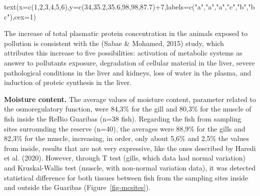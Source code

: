 \documentclass[
  american,
  letterpaper,
  DIV=11,
  numbers=noendperiod]{scrartcl}
\newenvironment{Shaded}{}{}
\newcommand{\AttributeTok}[1]{\textcolor[rgb]{0.49,0.56,0.16}{#1}}
\newcommand{\DecValTok}[1]{\textcolor[rgb]{0.25,0.63,0.44}{#1}}
\newcommand{\FloatTok}[1]{\textcolor[rgb]{0.25,0.63,0.44}{#1}}
\newcommand{\FunctionTok}[1]{\textcolor[rgb]{0.02,0.16,0.49}{#1}}
\newcommand{\NormalTok}[1]{#1}
\newcommand{\SpecialCharTok}[1]{\textcolor[rgb]{0.25,0.44,0.63}{#1}}
\newcommand{\StringTok}[1]{\textcolor[rgb]{0.25,0.44,0.63}{#1}}
\begin{document}
\begin{Shaded}
\begin{Highlighting}[numbers=left,,]
\FunctionTok{text}\NormalTok{(}\AttributeTok{x=}\FunctionTok{c}\NormalTok{(}\DecValTok{1}\NormalTok{,}\DecValTok{2}\NormalTok{,}\DecValTok{3}\NormalTok{,}\DecValTok{4}\NormalTok{,}\DecValTok{5}\NormalTok{,}\DecValTok{6}\NormalTok{),}\AttributeTok{y=}\FunctionTok{c}\NormalTok{(}\DecValTok{34}\NormalTok{,}\FloatTok{35.2}\NormalTok{,}\FloatTok{35.6}\NormalTok{,}\DecValTok{98}\NormalTok{,}\DecValTok{98}\NormalTok{,}\FloatTok{87.7}\NormalTok{)}\SpecialCharTok{+}\DecValTok{7}\NormalTok{,}\AttributeTok{labels=}\FunctionTok{c}\NormalTok{(}\StringTok{"a"}\NormalTok{,}\StringTok{"a"}\NormalTok{,}\StringTok{"a"}\NormalTok{,}\StringTok{"c"}\NormalTok{,}\StringTok{"b"}\NormalTok{,}\StringTok{"bc"}\NormalTok{),}\AttributeTok{cex=}\DecValTok{1}\NormalTok{)}
\end{Highlighting}
\end{Shaded}

The increase of total plasmatic protein concentration in the animals
exposed to pollution is consistent with the (Sabae \& Mohamed, 2015)
study, which attributes this increase to five possibilities: activation
of metabolic systems as answer to pollutants exposure, degradation of
cellular material in the liver, severe pathological conditions in the
liver and kidneys, loss of water in the plasma, and induction of proteic
synthesis in the liver.

\textbf{Moisture content.} The average values of moisture content,
parameter related to the osmoregulatory function, were 84,3\% for the
gill and 80,3\% for the muscle of fish inside the ReBio Guaribas (n=38
fish). Regarding the fish from sampling sites surrounding the reserve
(n=40), the averages were 88,9\% for the gills and 82,3\% for the
muscle, increasing, in order, only about 5,6\% and 2,5\% the values from
inside, results that are not very expressive, like the ones described by
Haredi et al. (2020). However, through T test (gills, which data had
normal variation) and Kruskal-Wallis test (muscle, with non-normal
variation data), it was detected statistical difference for both tissues
between fish from the sampling sites inside and outside the Guaribas
(Figure~\ref{fig-mcsites}).
\end{document}

